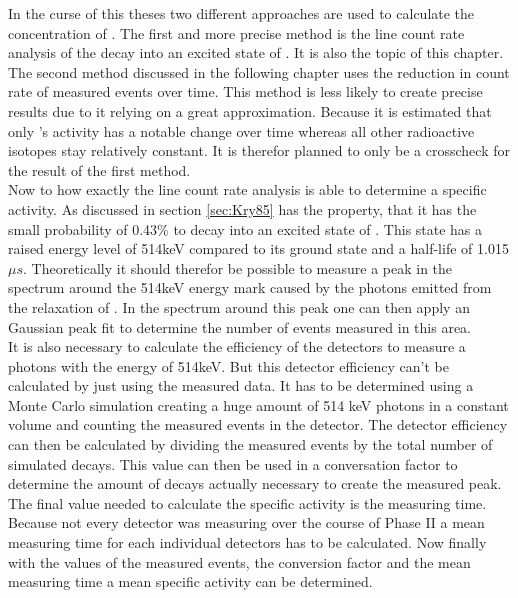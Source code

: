 In the curse of this theses two different approaches are used to calculate the concentration of \Kr. 
The first and more precise method is the line count rate analysis of the \Kr decay into an excited state of . 
It is also the topic of this chapter.
The second method discussed in the following chapter uses the reduction in count rate of measured events over time. 
This method is less likely to create precise results due to it relying on a great approximation.
Because it is estimated that only \Kr's activity has a notable change over time whereas all other radioactive isotopes stay relatively constant. 
It is therefor planned to only be a crosscheck for the result of the first method.
\\

Now to how exactly the line count rate analysis is able to determine a specific activity.
As discussed in section \ref{sec:Kry85} has \Kr the property, that it has the small probability of 0.43\% to decay into an excited state of . 
This state has a raised energy level of 514keV compared to its ground state and a half-life of 1.015\(\unit{\mu s}\). 
Theoretically it should therefor be possible to measure a peak in the spectrum around the 514keV energy mark caused by the photons emitted from the relaxation of .
In the spectrum around this peak one can then apply an Gaussian peak fit to determine the number of events measured in this area. 
\\

It is also necessary to calculate the efficiency of the detectors to measure a photons with the energy of 514keV.
But this detector efficiency can't be calculated by just using the measured data.
It has to be determined using a Monte Carlo simulation creating a huge amount of 514 keV photons in a constant volume and counting the measured events in the detector. 
The detector efficiency can then be calculated by dividing the measured events by the total number of simulated decays.
This value can then be used in a conversation factor to determine the amount of decays actually necessary to create the measured peak.
\\

The final value needed to calculate the specific activity is the measuring time.
Because not every detector was measuring over the course of Phase II a mean measuring time for each individual detectors has to be calculated.
Now finally with the values of the measured events, the conversion factor and the mean measuring time a mean specific activity can be determined. 
\\

